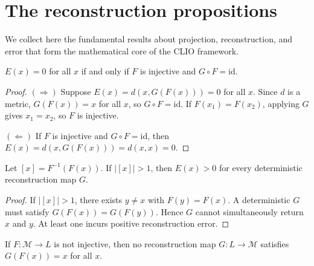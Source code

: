 

\section{The reconstruction propositions}
\label{sec:reconstruction-propositions}

We collect here the fundamental results about projection,
reconstruction, and error that form the mathematical core of
the CLIO framework.

\begin{proposition}
  \label{prop:perfect-recon}
  $E(x) = 0$ for all $x$ if and only if $F$ is injective
  and $G \circ F = \mathrm{id}$.
\end{proposition}

\begin{proof}
  $(\Rightarrow)$ Suppose $E(x) = d(x, G(F(x))) = 0$ for all $x$.
  Since $d$ is a metric, $G(F(x)) = x$ for all $x$,
  so $G \circ F = \mathrm{id}$.
  If $F(x_1) = F(x_2)$, applying $G$ gives $x_1 = x_2$,
  so $F$ is injective.

  $(\Leftarrow)$ If $F$ is injective and $G \circ F = \mathrm{id}$,
  then $E(x) = d(x, G(F(x))) = d(x,x) = 0$.
\end{proof}

\begin{proposition}
  \label{prop:kernel-lower}
  Let $[x] = F^{-1}(F(x))$.
  If $|[x]| > 1$, then $E(x) > 0$ for every deterministic
  reconstruction map $G$.
\end{proposition}

\begin{proof}
  If $|[x]| > 1$, there exists $y \neq x$ with $F(y) = F(x)$.
  A deterministic $G$ must satisfy $G(F(x)) = G(F(y))$.
  Hence $G$ cannot simultaneously return $x$ and $y$.
  At least one incurs positive reconstruction error.
\end{proof}

\begin{theorem}
  \label{thm:recon-lower}
  If $F : \mathcal{M} \to L$ is not injective, then no
  reconstruction map $G : L \to \mathcal{M}$ satisfies
  $G(F(x)) = x$ for all $x$.
\end{theorem}

